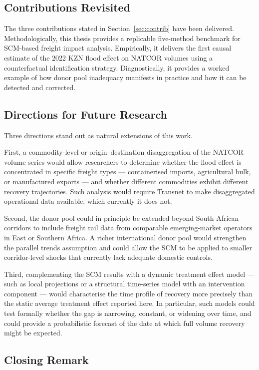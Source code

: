 \subsection*{Contributions Revisited}

The three contributions stated in Section~\ref{sec:contrib} have
been delivered.
Methodologically, this thesis provides a replicable five-method
benchmark for SCM-based freight impact analysis.
Empirically, it delivers the first causal estimate of the 2022 KZN
flood effect on NATCOR volumes using a counterfactual identification
strategy.
Diagnostically, it provides a worked example of how donor pool
inadequacy manifests in practice and how it can be detected and
corrected.

\subsection*{Directions for Future Research}

Three directions stand out as natural extensions of this work.

First, a commodity-level or origin--destination disaggregation of
the NATCOR volume series would allow researchers to determine whether
the flood effect is concentrated in specific freight types ---
containerised imports, agricultural bulk, or manufactured exports ---
and whether different commodities exhibit different recovery
trajectories.
Such analysis would require Transnet to make disaggregated operational
data available, which currently it does not.

Second, the donor pool could in principle be extended beyond South
African corridors to include freight rail data from comparable
emerging-market operators in East or Southern Africa.
A richer international donor pool would strengthen the parallel
trends assumption and could allow the SCM to be applied to smaller
corridor-level shocks that currently lack adequate domestic controls.

Third, complementing the SCM results with a dynamic treatment effect
model --- such as local projections or a structural time-series
model with an intervention component --- would characterise the
time profile of recovery more precisely than the static average
treatment effect reported here.
In particular, such models could test formally whether the gap
is narrowing, constant, or widening over time, and could provide
a probabilistic forecast of the date at which full volume recovery
might be expected.

\subsection*{Closing Remark}

